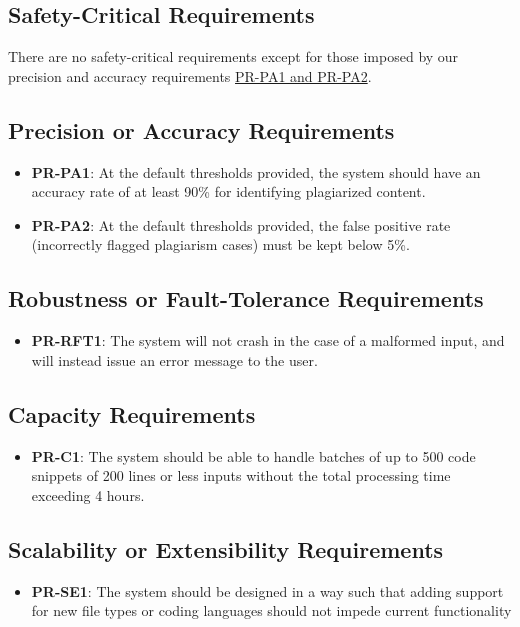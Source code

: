\documentclass[12pt]{article}
\begin{document}
\subsection{Safety-Critical Requirements}
There are no safety-critical requirements except for those imposed by our 
precision and accuracy requirements \hyperlink{subsection.12.3}{PR-PA1 and PR-PA2}.
\subsection{Precision or Accuracy Requirements}
\begin{itemize}
    \item \textbf{PR-PA1}: At the default thresholds provided, the system should 
    have an accuracy rate of at least 90\% for identifying plagiarized content.
    \item \textbf{PR-PA2}: At the default thresholds provided, the false positive 
    rate (incorrectly flagged plagiarism cases) must be kept below 5\%.
\end{itemize}
\subsection{Robustness or Fault-Tolerance Requirements}
\begin{itemize}
    \item \textbf{PR-RFT1}: The system will not crash in the case of a malformed input, and will instead issue an error message to the user.
\end{itemize}
\subsection{Capacity Requirements}
\begin{itemize}
    \item \textbf{PR-C1}: The system should be able to handle batches of up to 500 code snippets of 200 lines or less inputs without the total processing time exceeding 4 hours.
\end{itemize}
\subsection{Scalability or Extensibility Requirements}
\begin{itemize}
    \item \textbf{PR-SE1}: The system should be designed in a way such that adding support for new file types or coding languages should not impede current functionality
\end{itemize}
\end{document}
